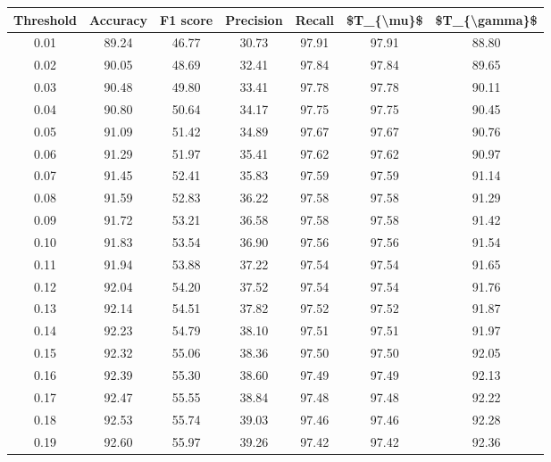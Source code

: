 \begin{tabular}{|c|c|c|c|c|c|c|}
\hline
 Threshold &  Accuracy &  F1 score &  Precision &  Recall &  \$T\_\{\textbackslash mu\}\$ &  \$T\_\{\textbackslash gamma\}\$ \\
\hline
      0.01 &     89.24 &     46.77 &      30.73 &   97.91 &      97.91 &         88.80 \\
      0.02 &     90.05 &     48.69 &      32.41 &   97.84 &      97.84 &         89.65 \\
      0.03 &     90.48 &     49.80 &      33.41 &   97.78 &      97.78 &         90.11 \\
      0.04 &     90.80 &     50.64 &      34.17 &   97.75 &      97.75 &         90.45 \\
      0.05 &     91.09 &     51.42 &      34.89 &   97.67 &      97.67 &         90.76 \\
      0.06 &     91.29 &     51.97 &      35.41 &   97.62 &      97.62 &         90.97 \\
      0.07 &     91.45 &     52.41 &      35.83 &   97.59 &      97.59 &         91.14 \\
      0.08 &     91.59 &     52.83 &      36.22 &   97.58 &      97.58 &         91.29 \\
      0.09 &     91.72 &     53.21 &      36.58 &   97.58 &      97.58 &         91.42 \\
      0.10 &     91.83 &     53.54 &      36.90 &   97.56 &      97.56 &         91.54 \\
      0.11 &     91.94 &     53.88 &      37.22 &   97.54 &      97.54 &         91.65 \\
      0.12 &     92.04 &     54.20 &      37.52 &   97.54 &      97.54 &         91.76 \\
      0.13 &     92.14 &     54.51 &      37.82 &   97.52 &      97.52 &         91.87 \\
      0.14 &     92.23 &     54.79 &      38.10 &   97.51 &      97.51 &         91.97 \\
      0.15 &     92.32 &     55.06 &      38.36 &   97.50 &      97.50 &         92.05 \\
      0.16 &     92.39 &     55.30 &      38.60 &   97.49 &      97.49 &         92.13 \\
      0.17 &     92.47 &     55.55 &      38.84 &   97.48 &      97.48 &         92.22 \\
      0.18 &     92.53 &     55.74 &      39.03 &   97.46 &      97.46 &         92.28 \\
      0.19 &     92.60 &     55.97 &      39.26 &   97.42 &      97.42 &         92.36 \\

\end{tabular}
